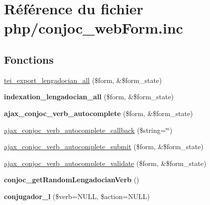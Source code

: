 \hypertarget{php_2conjoc__webForm_8inc}{}\section{Référence du fichier php/conjoc\+\_\+web\+Form.inc}
\label{php_2conjoc__webForm_8inc}
\subsection*{Fonctions}
\begin{DoxyCompactItemize}
\item 
\hyperlink{php_2conjoc__webForm_8inc_a9c7725a828c1a44761bc51fe7a346215}{tei\+\_\+export\+\_\+lengadocian\+\_\+all} (\$form, \&\$form\+\_\+state)
\item 
\hypertarget{php_2conjoc__webForm_8inc_a465cce16b0d09f364ccb546c46c82306}{}\label{php_2conjoc__webForm_8inc_a465cce16b0d09f364ccb546c46c82306} 
{\bfseries indexation\+\_\+lengadocian\+\_\+all} (\$form, \&\$form\+\_\+state)
\item 
\hypertarget{php_2conjoc__webForm_8inc_a3698c970fd73cda200a3a459dc50beec}{}\label{php_2conjoc__webForm_8inc_a3698c970fd73cda200a3a459dc50beec} 
{\bfseries ajax\+\_\+conjoc\+\_\+verb\+\_\+autocomplete} (\$form, \&\$form\+\_\+state)
\item 
\hyperlink{php_2conjoc__webForm_8inc_a5ea54e98ecadf55b7fe917fe6237a52e}{ajax\+\_\+conjoc\+\_\+verb\+\_\+autocomplete\+\_\+callback} (\$string=\char`\"{}\char`\"{})
\item 
\hyperlink{php_2conjoc__webForm_8inc_add934c4187ded056db9c8369764a51ed}{ajax\+\_\+conjoc\+\_\+verb\+\_\+autocomplete\+\_\+submit} (\$form, \&\$form\+\_\+state)
\item 
\hyperlink{php_2conjoc__webForm_8inc_ae85a92c4f091005289a97fb20b8762ef}{ajax\+\_\+conjoc\+\_\+verb\+\_\+autocomplete\+\_\+validate} (\$form, \&\$form\+\_\+state)
\item 
\hypertarget{php_2conjoc__webForm_8inc_aacc782a067b5e8fdaeca34be9a282c61}{}\label{php_2conjoc__webForm_8inc_aacc782a067b5e8fdaeca34be9a282c61} 
{\bfseries conjoc\+\_\+get\+Random\+Lengadocian\+Verb} ()
\item 
\hypertarget{php_2conjoc__webForm_8inc_aab99a7a60692cf7228d4a79924c32cb2}{}\label{php_2conjoc__webForm_8inc_aab99a7a60692cf7228d4a79924c32cb2} 
{\bfseries conjugador\+\_\+l} (\$verb=N\+U\+LL, \$action=N\+U\+LL)
\item 
\hypertarget{php_2conjoc__webForm_8inc_a5d341264c049e9bda5fd2d0acce4dfd7}{}\label{php_2conjoc__webForm_8inc_a5d341264c049e9bda5fd2d0acce4dfd7} 

\end{DoxyCompactItemize}
